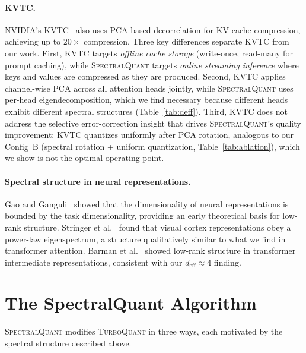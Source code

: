 \documentclass[11pt]{article}
\newcommand{\deff}{d_{\mathrm{eff}}}
\newcommand{\TQ}{\textsc{TurboQuant}}
\newcommand{\SQ}{\textsc{SpectralQuant}}
\begin{document}
\paragraph{KVTC.}
NVIDIA's KVTC~\citep{kvtc2026} also uses PCA-based decorrelation for KV cache
compression, achieving up to $20\times$ compression.  Three key differences
separate KVTC from our work.  First, KVTC targets \emph{offline cache storage}
(write-once, read-many for prompt caching), while \SQ{} targets \emph{online
streaming inference} where keys and values are compressed as they are produced.
Second, KVTC applies channel-wise PCA across all attention heads jointly, while
\SQ{} uses per-head eigendecomposition, which we find necessary because
different heads exhibit different spectral structures (Table~\ref{tab:deff}).
Third, KVTC does not address the selective error-correction insight that drives
\SQ{}'s quality improvement: KVTC quantizes uniformly after PCA rotation,
analogous to our Config~B (spectral rotation + uniform quantization, Table~\ref{tab:ablation}),
which we show is not the optimal operating point.

\paragraph{Spectral structure in neural representations.}
Gao and Ganguli~\citep{gao2015linear} showed that the dimensionality of neural
representations is bounded by the task dimensionality, providing an early
theoretical basis for low-rank structure.  Stringer et
al.~\citep{stringer2019high} found that visual cortex representations obey a
power-law eigenspectrum, a structure qualitatively similar to what we find in
transformer attention.  Barman et al.~\citep{barman2026geometry} showed
low-rank structure in transformer intermediate representations, consistent with
our $\deff \approx 4$ finding.

\section{The SpectralQuant Algorithm}
\label{sec:algorithm}

\SQ{} modifies \TQ{} in three ways, each motivated by the spectral structure
described above.
\end{document}
